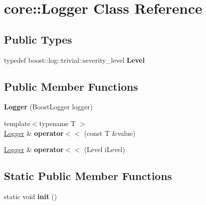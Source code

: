 \hypertarget{classcore_1_1_logger}{}\section{core\+:\+:Logger Class Reference}
\label{classcore_1_1_logger}
\subsection*{Public Types}
\begin{DoxyCompactItemize}
\item 
\mbox{\label{classcore_1_1_logger_a9d313323e4254b8ca7dde80b632ad3a0}} 
typedef boost\+::log\+::trivial\+::severity\+\_\+level {\bfseries Level}
\end{DoxyCompactItemize}
\subsection*{Public Member Functions}
\begin{DoxyCompactItemize}
\item 
\mbox{\label{classcore_1_1_logger_a492c479ca373cf0bc6fdd9e0b8f367d1}} 
{\bfseries Logger} (Boost\+Logger logger)
\item 
\mbox{\label{classcore_1_1_logger_aab316cdc29e0afd83f9552a455059f13}} 
{\footnotesize template$<$typename T $>$ }\\\hyperlink{classcore_1_1_logger}{Logger} \& {\bfseries operator$<$$<$} (const T \&value)
\item 
\mbox{\label{classcore_1_1_logger_ab76433ed8ab156d7b6c9209e43a95ca3}} 
\hyperlink{classcore_1_1_logger}{Logger} \& {\bfseries operator$<$$<$} (Level i\+Level)
\end{DoxyCompactItemize}
\subsection*{Static Public Member Functions}
\begin{DoxyCompactItemize}
\item 
\mbox{\label{classcore_1_1_logger_ab46b62e4c516ea0b2a62ff4b66d8bb8c}} 
static void {\bfseries init} ()
\end{DoxyCompactItemize}
